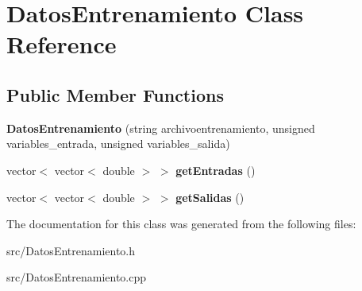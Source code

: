 \hypertarget{classDatosEntrenamiento}{\section{Datos\-Entrenamiento Class Reference}
\label{classDatosEntrenamiento}
}
\subsection*{Public Member Functions}
\begin{DoxyCompactItemize}
\item 
\hypertarget{classDatosEntrenamiento_ab5a8f5a72a62af6f815cd66f15d161d8}{{\bfseries Datos\-Entrenamiento} (string archivoentrenamiento, unsigned variables\-\_\-entrada, unsigned variables\-\_\-salida)}\label{classDatosEntrenamiento_ab5a8f5a72a62af6f815cd66f15d161d8}

\item 
\hypertarget{classDatosEntrenamiento_a09eede6dc8281b0da36f576b105c1c19}{vector$<$ vector$<$ double $>$ $>$ {\bfseries get\-Entradas} ()}\label{classDatosEntrenamiento_a09eede6dc8281b0da36f576b105c1c19}

\item 
\hypertarget{classDatosEntrenamiento_a711631dcea52cb8d8f6faa5bc5c11c69}{vector$<$ vector$<$ double $>$ $>$ {\bfseries get\-Salidas} ()}\label{classDatosEntrenamiento_a711631dcea52cb8d8f6faa5bc5c11c69}

\end{DoxyCompactItemize}


The documentation for this class was generated from the following files\-:\begin{DoxyCompactItemize}
\item 
src/Datos\-Entrenamiento.\-h\item 
src/Datos\-Entrenamiento.\-cpp\end{DoxyCompactItemize}
